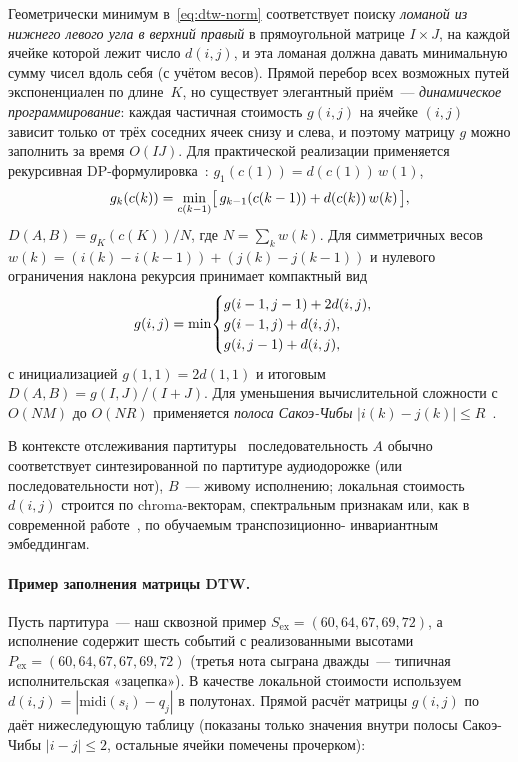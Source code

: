 Геометрически минимум в~\eqref{eq:dtw-norm} соответствует
поиску \textit{ломаной из нижнего левого угла в верхний
правый} в прямоугольной матрице $I \times J$, на каждой ячейке
которой лежит число $d(i, j)$, и эта ломаная должна давать
минимальную сумму чисел вдоль себя (с учётом весов). Прямой
перебор всех возможных путей экспоненциален по длине~$K$, но
существует элегантный приём~--- \textit{динамическое
программирование}: каждая частичная стоимость $g(i, j)$ на
ячейке $(i, j)$ зависит только от трёх соседних ячеек снизу и
слева, и поэтому матрицу $g$ можно заполнить за время
$O(IJ)$. Для практической реализации применяется рекурсивная
DP-формулировка~\cite[уравн.~16--18]{SakoeChiba1978}:
$g_1(c(1)) = d(c(1))\,w(1)$,
\begin{equation}
g_k(c(k)) = \min_{c(k-1)} \bigl[\,g_{k-1}(c(k-1)) +
                                 d(c(k))\,w(k)\,\bigr],
\eqlab{dtw-dp}
\end{equation}
$D(A,B) = g_K(c(K))/N$, где $N=\sum_k w(k)$. Для симметричных весов
$w(k) = (i(k)-i(k-1)) + (j(k)-j(k-1))$ и нулевого ограничения
наклона рекурсия принимает компактный вид
\begin{equation}
g(i,j) = \min\!\begin{cases}
g(i-1,j-1) + 2d(i,j),\\
g(i-1,j) + d(i,j),\\
g(i,j-1) + d(i,j),
\end{cases}
\eqlab{dtw-symmetric}
\end{equation}
с инициализацией $g(1,1)=2d(1,1)$ и итоговым $D(A,B)=g(I,J)/(I+J)$.
Для уменьшения вычислительной сложности с $O(NM)$ до $O(NR)$
применяется \textit{полоса Сакоэ-Чибы} $|i(k)-j(k)|\le R$~\cite[уравн.~8]{SakoeChiba1978}.

В контексте отслеживания партитуры~\cite{Mueller2007,Arzt2016}
последовательность $A$ обычно соответствует синтезированной по
партитуре аудиодорожке (или последовательности нот), $B$~---
живому исполнению; локальная стоимость $d(i,j)$ строится по
chroma-векторам, спектральным признакам или, как в современной
работе~\cite{ArztLattner2018}, по обучаемым транспозиционно-
инвариантным эмбеддингам.

\paragraph*{Пример заполнения матрицы DTW.} Пусть партитура~---
наш сквозной пример $S_{\text{ex}} = (60, 64, 67, 69, 72)$, а
исполнение содержит шесть событий с реализованными высотами
$P_{\text{ex}} = (60, 64, 67, 67, 69, 72)$ (третья нота сыграна
дважды~--- типичная исполнительская «зацепка»). В качестве
локальной стоимости используем
$d(i,j) = |\text{midi}(s_i) - q_j|$ в полутонах. Прямой расчёт
матрицы $g(i,j)$ по~ даёт нижеследующую
таблицу (показаны только значения внутри полосы Сакоэ-Чибы
$|i-j|\le 2$, остальные ячейки помечены прочерком):

